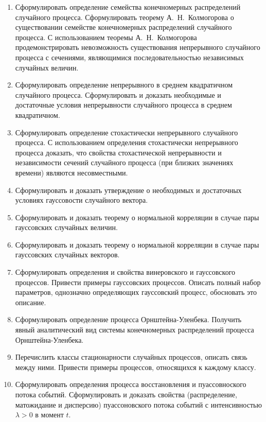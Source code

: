 \documentclass[a4paper,12pt]{extreport}
\renewcommand{\=}[1]{\stackrel{#1}{=}} %
\begin{document}
\begin{enumerate}
	\item Сформулировать определение семейства конечномерных распределений случайного процесса.
	Сформулировать теорему А.~Н.~Колмогорова о существовании семействе конечномерных
	распределений случайного процесса. С использованием теоремы А.~Н.~Колмогорова 
	продемонстрировать невозможность существования непрерывного случайного процесса
	с сечениями, являющимися последовательностью независимых случайных величин.

	\item Сформулировать определение непрерывного в среднем квадратичном случайного процесса.
	Сформулировать и доказать необходимые и достаточные условия непрерывности
	случайного процесса в среднем квадратичном.

	\item Сформулировать определение стохастически непрерывного случайного процесса.
	С использованием определения стохастически непрерывного процесса
	доказать, что свойства стохастической непрерывности и независимости 
	сечений случайного процесса (при близких значениях времени) являются несовместными.

	\item Сформулировать и доказать утверждение о необходимых
	и достаточных условиях гауссовости случайного вектора.

	\item Сформулировать и доказать теорему о нормальной корреляции
	в случае пары гауссовских случайных величин.

	\item Сформулировать и доказать теорему о нормальной корреляции
	в случае пары гауссовских случайных векторов.

	\item Сформулировать определения и свойства винеровского
	и гауссовского процессов. Привести примеры гауссовских процессов.
	Описать полный набор параметров, однозначно определяющих гауссовский 
	процесс, обосновать это описание.

	\item Сформулировать определение процесса Орнштейна-Уленбека.
	Получить явный аналитический вид системы конечномерных
	распределений процесса Орнштейна-Уленбека.

	\item Перечислить классы стационарности случайных процессов,
	описать связь между ними.
	Привести примеры процессов, относящихся к каждому классу.

	\item Сформулировать определения процесса восстановления
	и пуассовноского потока событий. Сформулировать и доказать свойства
	(распределение, матожидание и дисперсию) пуассоновского
	потока событий с интенсивностью $\lambda > 0$ в момент $t$.


\end{enumerate}
\end{document}
